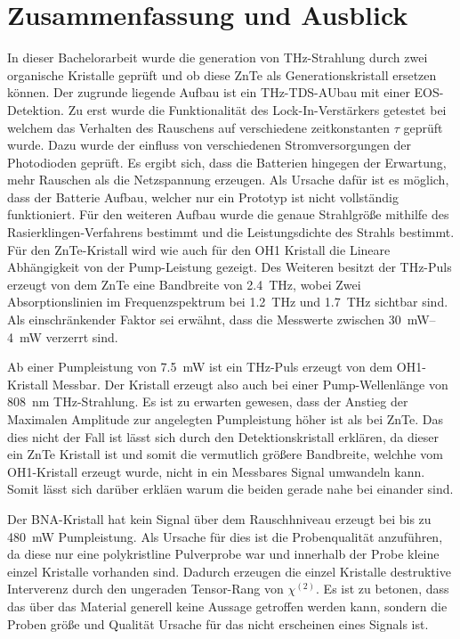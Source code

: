 
\chapter{Zusammenfassung und Ausblick}
\label{sec:za}
In dieser Bachelorarbeit wurde die generation von THz-Strahlung durch zwei organische Kristalle geprüft
und ob diese ZnTe als Generationskristall ersetzen können. 
Der zugrunde liegende Aufbau ist ein THz-TDS-AUbau mit einer EOS-Detektion. 
Zu erst wurde die Funktionalität des Lock-In-Verstärkers getestet bei welchem das Verhalten 
des Rauschens auf verschiedene zeitkonstanten $\tau$ geprüft wurde. 
Dazu wurde der einfluss von verschiedenen Stromversorgungen der Photodioden geprüft. 
Es ergibt sich, dass die Batterien hingegen der Erwartung, mehr Rauschen als die Netzspannung erzeugen. 
Als Ursache dafür ist es möglich, dass der Batterie Aufbau, welcher nur ein Prototyp ist nicht vollständig funktioniert. 
Für den weiteren Aufbau wurde die genaue Strahlgröße mithilfe des Rasierklingen-Verfahrens bestimmt und die Leistungsdichte des Strahls bestimmt.
Für den ZnTe-Kristall wird wie auch für den OH1 Kristall die Lineare Abhängigkeit von der Pump-Leistung gezeigt. 
Des Weiteren besitzt der THz-Puls erzeugt von dem ZnTe eine Bandbreite von \SI{2.4}{THz}, wobei 
Zwei Absorptionslinien im Frequenzspektrum bei \SI{1.2}{THz} und \SI{1.7}{THz} sichtbar sind. 
Als einschränkender Faktor sei erwähnt, dass die Messwerte zwischen \SIrange{30}{4}{mW} verzerrt sind. 
 
Ab einer Pumpleistung von \SI{7.5}{mW} ist ein THz-Puls erzeugt von dem OH1-Kristall Messbar. 
Der Kristall erzeugt also auch bei einer Pump-Wellenlänge von \SI{808}{nm} THz-Strahlung. 
Es ist zu erwarten gewesen, dass der Anstieg der Maximalen Amplitude zur angelegten Pumpleistung höher ist als bei ZnTe. 
Das dies nicht der Fall ist lässt sich durch den Detektionskristall erklären, da dieser ein ZnTe Kristall ist und somit die 
vermutlich größere Bandbreite, welchhe vom OH1-Kristall erzeugt wurde, nicht in ein Messbares Signal umwandeln kann. 
Somit lässt sich darüber erkläen warum die beiden gerade nahe bei einander sind. 

Der BNA-Kristall hat kein Signal über dem Rauschhniveau erzeugt bei bis zu \SI{480}{mW} Pumpleistung. 
Als Ursache für dies ist die Probenqualität anzuführen, da diese nur eine polykristline Pulverprobe war und innerhalb der Probe kleine 
einzel Kristalle vorhanden sind. 
Dadurch erzeugen die einzel Kristalle destruktive Interverenz durch den ungeraden Tensor-Rang von $\chi^{(2)}$. 
Es ist zu betonen, dass das über das Material generell keine Aussage getroffen werden kann, sondern die Proben größe und Qualität Ursache 
für das nicht erscheinen eines Signals ist.

